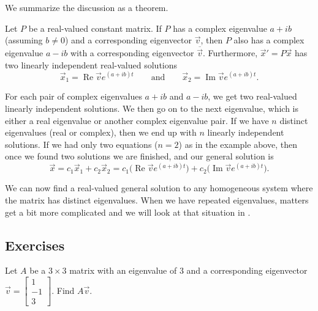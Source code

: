 \medskip

We summarize the discussion as a theorem.

\begin{theorem}
Let $P$ be a real-valued constant matrix.
If $P$ has a complex eigenvalue $a+ib$ (assuming $b\neq 0$) and a corresponding eigenvector
$\vec{v}$, then $P$ also has a complex eigenvalue $a-ib$ with
a corresponding eigenvector $\overline{\vec{v}}$.
Furthermore,
${\vec{x}}' = P\vec{x}$ has
two linearly independent real-valued solutions
\begin{equation*}
\vec{x}_1 = \operatorname{Re} \vec{v} e^{(a+ib)t}
\qquad
\text{and}
\qquad
\vec{x}_2 = \operatorname{Im} \vec{v} e^{(a+ib)t} .
\end{equation*}
\end{theorem}

For each pair of complex eigenvalues $a+ib$ and $a-ib$,
we get two real-valued linearly
independent solutions.
We then go on to the next
eigenvalue, which is either a real eigenvalue or another complex eigenvalue
pair.  If we have $n$ distinct eigenvalues (real or complex), then we end up with $n$ linearly independent solutions.
If we had only two equations ($n=2$) as in the example above,
then once we found two solutions we are
finished, and our general solution is
\begin{equation*}
\vec{x} =
c_1 \vec{x}_1 + c_2 \vec{x}_2
= 
c_1 \bigl( \operatorname{Re} \vec{v} e^{(a+ib)t} \bigr) +
c_2 \bigl( \operatorname{Im} \vec{v} e^{(a+ib)t} \bigr)
.
\end{equation*}

We can now find a real-valued general solution to any homogeneous
system where the matrix has distinct eigenvalues.  When we have repeated
eigenvalues, matters get a bit more complicated and we will look at that
situation in .

\subsection{Exercises}

\begin{exercise}[easy]
Let $A$ be a $3 \times 3$ matrix with an eigenvalue of 3 and a
corresponding eigenvector $\vec{v} =
\left[ \begin{smallmatrix} 1 \\ -1 \\ 3 \end{smallmatrix} \right]$.
Find $A \vec{v}$.
\end{exercise}

